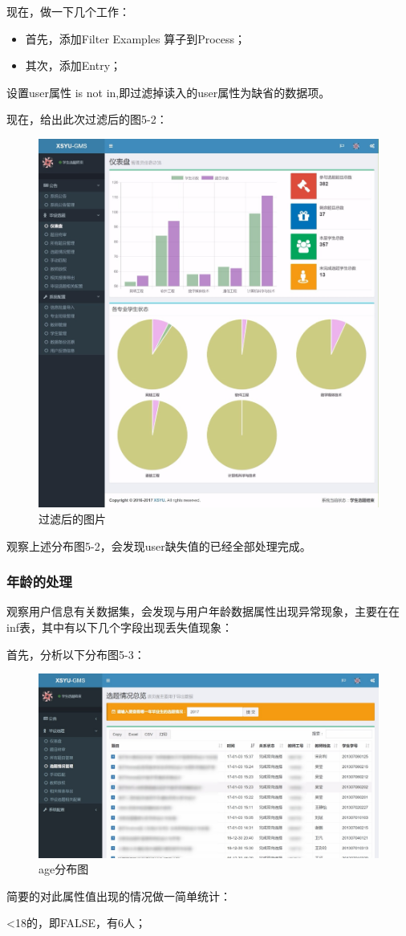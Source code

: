 现在，做一下几个工作：

\begin{itemize}
	\item 首先，添加Filter Examples 算子到Process；
	\item 其次，添加Entry；
\end{itemize}

设置user属性 is not in,即过滤掉读入的user属性为缺省的数据项。

现在，给出此次过滤后的图5-2：

\begin{figure}[thbp!]
	\centering
	\includegraphics[width=0.4\linewidth]{figure/5-2}
	\caption{过滤后的图片}
	\label{fig:5-2}
\end{figure}

观察上述分布图5-2，会发现user缺失值的已经全部处理完成。

\subsubsection{ 年龄的处理}
观察用户信息有关数据集，会发现与用户年龄数据属性出现异常现象，主要在在inf表，其中有以下几个字段出现丢失值现象：

 首先，分析以下分布图5-3：
 
 \begin{figure}[thbp!]
 	\centering
 	\includegraphics[width=0.4\linewidth]{figure/5-3}
 	\caption{age分布图}
 	\label{fig:5-3}
 \end{figure}

简要的对此属性值出现的情况做一简单统计：

<18的，即FALSE，有6人；

